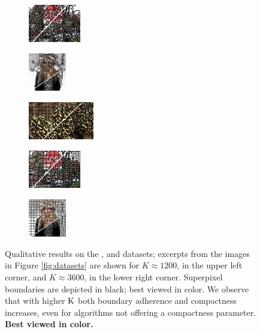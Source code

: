 \begin{figure}
\begin{subfigure}[b]{0.16\textwidth}
	\end{subfigure}
	\begin{subfigure}[b]{0.129\textwidth}
		\includegraphics[height=1.65cm]{pictures/sbd/poise/cropped/poise_6000067_contours}
	\end{subfigure}
	\begin{subfigure}[b]{0.10\textwidth}
		\includegraphics[height=1.65cm]{pictures/fash/poise/cropped/poise_132_contours}
	\end{subfigure}
	\begin{subfigure}[b]{0.02\textwidth}
	\end{subfigure}
	\begin{subfigure}[b]{0.16\textwidth}
		\includegraphics[height=1.65cm]{pictures/bsds500/seaw/cropped/seaw_208078_contours}
	\end{subfigure}
	\begin{subfigure}[b]{0.129\textwidth}
		\includegraphics[height=1.65cm]{pictures/sbd/seaw/cropped/seaw_6000067_contours}
	\end{subfigure}
	\begin{subfigure}[b]{0.10\textwidth}
		\includegraphics[height=1.65cm]{pictures/fash/seaw/cropped/seaw_132_contours}
	\end{subfigure}
	\caption{Qualitative results on the \BSDS, \SBD and \Fash datasets; excerpts from the
	images in Figure \ref{fig:datasets} are shown for $K \approx 1200$, in the upper left corner,
	and $K \approx 3600$, in the lower right corner. Superpixel boundaries are depicted in black;
	best viewed in color. We observe that with higher $\text{K}$ both boundary adherence and
	compactness increases, even for algorithms not offering a compactness parameter.
	\textbf{Best viewed in color.}}
	\label{fig:appendix-experiments-qualitative-bsds500-sbd-fash}
\end{figure}

